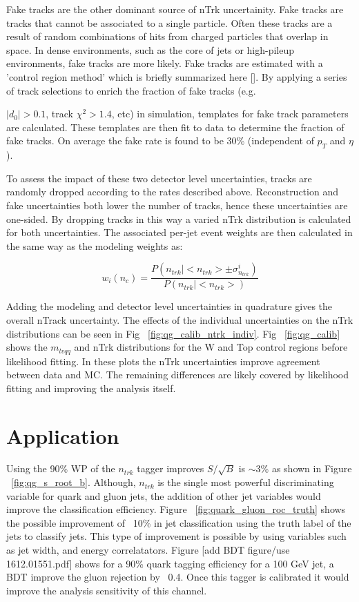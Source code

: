 Fake tracks are the other dominant source of nTrk uncertainity. Fake tracks are tracks that cannot be associated to a single particle. Often these tracks are a result of random combinations of hits from charged particles that overlap in space. In dense environments, such as the core of jets or high-pileup environments, fake tracks are more likely. Fake tracks are estimated with a 'control region method' which is briefly summarized here [\cite{FakeTracks}]. By applying a series of track selections to enrich the fraction of fake tracks (e.g. {$|d_{0}| > 0.1$, track $\chi^{2}>1.4$, etc) in simulation, templates for fake track parameters are calculated. These templates are then fit to data to determine the fraction of fake tracks. On average the fake rate is found to be 30\% (independent of $p_{T}$ and $\eta$).

To assess the impact of these two detector level uncertainties, tracks are randomly dropped according to the rates described above. Reconstruction and fake uncertainties both lower the number of tracks, hence these uncertainties are one-sided. By dropping tracks in this way a varied nTrk distribution is calculated for both uncertainties. The associated per-jet event weights are then calculated in the same way as the modeling weights as:

\begin{equation}
w_{i}(n_{c}) = \frac{P(n_{trk}|<n_{trk}> \pm \sigma^{i}_{n_{trk}})} {P(n_{trk}|<n_{trk}>)}
\end{equation}


Adding the modeling and detector level uncertainties in quadrature gives the overall nTrack uncertainty. The effects of the individual uncertainties on the nTrk distributions can be seen in Fig ~\ref{fig:qg_calib_ntrk_indiv}. Fig ~\ref{fig:qg_calib} shows the $m_{lvqq}$ and nTrk distributions for the W and Top control regions before likelihood fitting. In these plots the nTrk uncertainties improve agreement between data and MC. The remaining differences are likely covered by likelihood fitting and improving the analysis itself.  

\chapter{Application}
Using the 90\% WP of the $n_{trk}$ tagger improves $S/\sqrt{B}$ is $\sim 3$\% as shown in Figure ~\ref{fig:qg_s_root_b}. Although, $n_{trk}$ is the single most powerful discriminating variable for quark and gluon jets, the addition of other jet variables would improve the classification efficiency. Figure ~\ref{fig:quark_gluon_roc_truth} shows the possible improvement of ~10\%  in jet classification using the truth label of the jets to classify jets.  This type of improvement is possible by using variables such as jet width, and energy correlatators. Figure [add BDT figure/use 1612.01551.pdf] shows for a 90\% quark tagging efficiency for a 100 GeV jet, a BDT improve the gluon rejection by ~0.4. Once this tagger is calibrated it would improve the analysis sensitivity of this channel.






}
